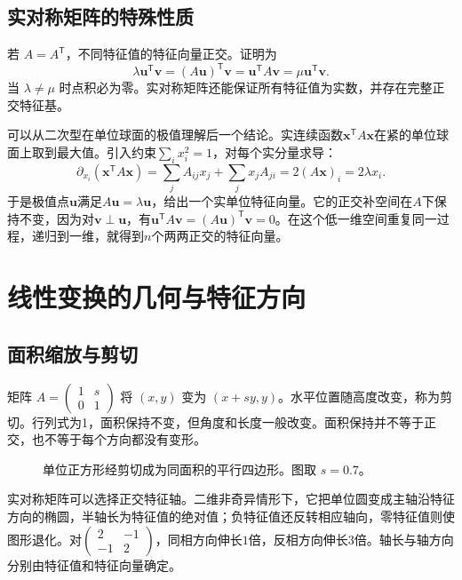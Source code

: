 \documentclass[11pt,openany,fontset=fandol]{ctexbook}
\theoremstyle{plain}\newtheorem{theorem}{定理}[chapter]\newtheorem{proposition}[theorem]{命题}
\theoremstyle{definition}\newtheorem{definition}{定义}[chapter]\newtheorem{example}{例}[chapter]
\theoremstyle{remark}\newtheorem*{remark}{说明}
\newcommand{\vct}[1]{\bm{#1}}\newcommand{\Rea}{\operatorname{Re}}\newcommand{\Ima}{\operatorname{Im}}
\begin{document}
\subsection{实对称矩阵的特殊性质}
若 $A=A^{\mathsf T}$，不同特征值的特征向量正交。证明为
\[
\lambda\vct u^{\mathsf T}\vct v=(A\vct u)^{\mathsf T}\vct v
=\vct u^{\mathsf T}A\vct v=\mu\vct u^{\mathsf T}\vct v.
\]
当 $\lambda\ne\mu$ 时点积必为零。实对称矩阵还能保证所有特征值为实数，并存在完整正交特征基。

可以从二次型在单位球面的极值理解后一个结论。实连续函数$\vct x^{\mathsf T}A\vct x$在紧的单位球面上取到最大值。引入约束$\sum_i x_i^2=1$，对每个实分量求导：
\[
\partial_{x_i}(\vct x^{\mathsf T}A\vct x)
=\sum_jA_{ij}x_j+\sum_jx_jA_{ji}
=2(A\vct x)_i=2\lambda x_i.
\]
于是极值点$\vct u$满足$A\vct u=\lambda\vct u$，给出一个实单位特征向量。它的正交补空间在$A$下保持不变，因为对$\vct v\perp\vct u$，有$\vct u^{\mathsf T}A\vct v=(A\vct u)^{\mathsf T}\vct v=0$。在这个低一维空间重复同一过程，递归到一维，就得到$n$个两两正交的特征向量。

\section{线性变换的几何与特征方向}
\subsection{面积缩放与剪切}
矩阵 $A=\begin{pmatrix}1&s\\0&1\end{pmatrix}$ 将 $(x,y)$ 变为 $(x+sy,y)$。水平位置随高度改变，称为剪切。行列式为1，面积保持不变，但角度和长度一般改变。面积保持并不等于正交，也不等于每个方向都没有变形。
\begin{figure}[htbp]\centering
{}
\caption{单位正方形经剪切成为同面积的平行四边形。图取 $s=0.7$。}
\label{fig:orig-061}
\end{figure}

实对称矩阵可以选择正交特征轴。二维非奇异情形下，它把单位圆变成主轴沿特征方向的椭圆，半轴长为特征值的绝对值；负特征值还反转相应轴向，零特征值则使图形退化。对$\begin{pmatrix}2&-1\\-1&2\end{pmatrix}$，同相方向伸长$1$倍，反相方向伸长$3$倍。轴长与轴方向分别由特征值和特征向量确定。
\end{document}
